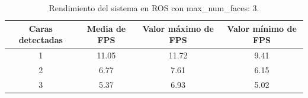 \begin{table}[H]
\begin{center}
\begin{adjustbox}{max width=\textwidth}
\begin{tabular}{|c|c|c|c|}
     \hline
    \textbf{Caras detectadas} & \textbf{Media de FPS} & \textbf{Valor máximo de FPS} & \textbf{Valor mínimo de FPS}\\
    \hline
     1 & 11.05 & 11.72 & 9.41\\
     2 & 6.77 & 7.61 & 6.15\\
     3 & 5.37 & 6.93 & 5.02\\
     \hline
 \end{tabular}
 \end{adjustbox}
 \captionsetup{justification=centering}
\caption{Rendimiento del sistema en ROS con max\_num\_faces: 3.}
\label{cuadro:rendimiento_ros_3}
\end{center}
\end{table}

